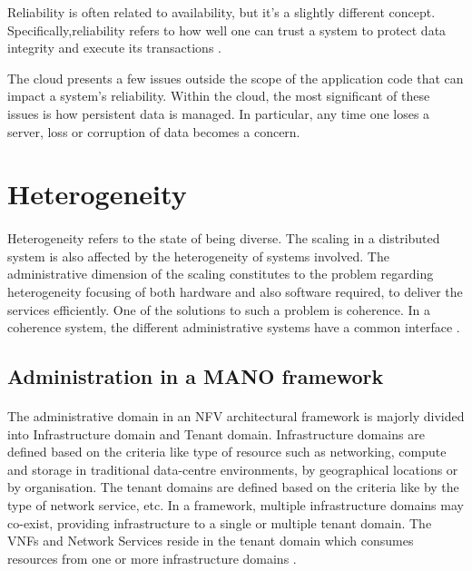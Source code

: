 Reliability is often related to availability, but it’s a slightly different concept. Specifically,reliability refers to how well one can trust a system to protect data integrity and execute its transactions \cite{reese_cloud_nodate}.

The cloud presents a few issues outside the scope of the application code that can impact a system’s reliability. Within the cloud, the most significant of these issues is how persistent data is managed. In particular, any time one loses a server, loss or corruption of data becomes a concern.

\section{Heterogeneity}
\paragraph{}Heterogeneity refers to the state of being diverse. The scaling in a distributed system is also affected by the heterogeneity of systems involved. The administrative dimension of the scaling constitutes to the problem regarding heterogeneity focusing of both hardware and also software required, to deliver the services efficiently. One of the solutions to such a problem is coherence. In a coherence system, the different administrative systems have a common interface \cite{ord1994scale}.


\subsection{Administration in a MANO framework}
\paragraph{}The administrative domain in an NFV architectural framework is majorly divided into Infrastructure domain and Tenant domain. Infrastructure domains are defined based on the criteria like type of resource such as networking, compute and storage in traditional data-centre environments, by geographical locations or by organisation. The tenant domains are defined based on the criteria like by the type of network service, etc. In a framework, multiple infrastructure domains may co-exist, providing infrastructure to a single or multiple tenant domain. The VNFs and Network Services reside in the tenant domain which consumes resources from one or more infrastructure domains \cite{peinetwork}.

